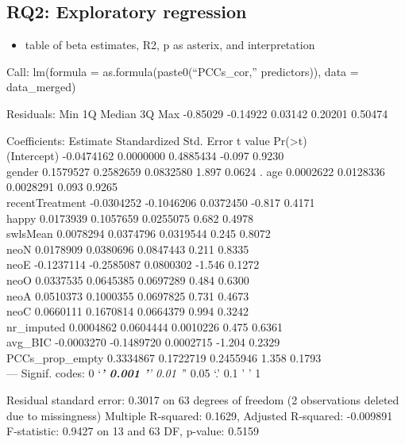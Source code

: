 \documentclass[
  english,
  man]{apa6}
\providecommand{\tightlist}{%
  \setlength{\itemsep}{0pt}\setlength{\parskip}{0pt}}
\begin{document}
\hypertarget{rq2-exploratory-regression}{%
\subsection{RQ2: Exploratory regression}\label{rq2-exploratory-regression}}

\begin{itemize}
\tightlist
\item
  table of beta estimates, R2, p as asterix, and interpretation
\end{itemize}

Call:
lm(formula = as.formula(paste0(``PCCs\_cor,'' predictors)), data = data\_merged)

Residuals:
Min 1Q Median 3Q Max
-0.85029 -0.14922 0.03142 0.20201 0.50474

Coefficients:
Estimate Standardized Std. Error t value Pr(\textgreater\textbar t\textbar)\\
(Intercept) -0.0474162 0.0000000 0.4885434 -0.097 0.9230\\
gender 0.1579527 0.2582659 0.0832580 1.897 0.0624 .
age 0.0002622 0.0128336 0.0028291 0.093 0.9265\\
recentTreatment -0.0304252 -0.1046206 0.0372450 -0.817 0.4171\\
happy 0.0173939 0.1057659 0.0255075 0.682 0.4978\\
swlsMean 0.0078294 0.0374796 0.0319544 0.245 0.8072\\
neoN 0.0178909 0.0380696 0.0847443 0.211 0.8335\\
neoE -0.1237114 -0.2585087 0.0800302 -1.546 0.1272\\
neoO 0.0337535 0.0645385 0.0697289 0.484 0.6300\\
neoA 0.0510373 0.1000355 0.0697825 0.731 0.4673\\
neoC 0.0660111 0.1670814 0.0664379 0.994 0.3242\\
nr\_imputed 0.0004862 0.0604444 0.0010226 0.475 0.6361\\
avg\_BIC -0.0003270 -0.1489720 0.0002715 -1.204 0.2329\\
PCCs\_prop\_empty 0.3334867 0.1722719 0.2455946 1.358 0.1793\\
---
Signif. codes: 0 `\emph{\textbf{' 0.001 '}' 0.01 '}' 0.05 `.' 0.1 ' ' 1

Residual standard error: 0.3017 on 63 degrees of freedom
(2 observations deleted due to missingness)
Multiple R-squared: 0.1629, Adjusted R-squared: -0.009891
F-statistic: 0.9427 on 13 and 63 DF, p-value: 0.5159
\end{document}
